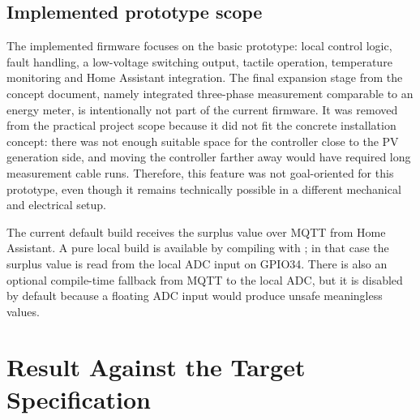 \documentclass[12pt,a4paper]{article}
\newcommand{\code}[1]{\texttt{\detokenize{#1}}}
\begin{document}
\subsection{Implemented prototype scope}

The implemented firmware focuses on the basic prototype: local control logic,
fault handling, a low-voltage switching output, tactile operation, temperature
monitoring and Home Assistant integration. The final expansion stage from the
concept document, namely integrated three-phase measurement comparable to an
energy meter, is intentionally not part of the current firmware. It was removed
from the practical project scope because it did not fit the concrete installation
concept: there was not enough suitable space for the controller close to the PV
generation side, and moving the controller farther away would have required long
measurement cable runs. Therefore, this feature was not goal-oriented for this
prototype, even though it remains technically possible in a different mechanical
and electrical setup.

The current default build receives the surplus value over MQTT from Home
Assistant. A pure local build is available by compiling with
\code{-D ENABLE_WIFI=0}; in that case the surplus value is read from the local
ADC input on GPIO34. There is also an optional compile-time fallback from MQTT to
the local ADC, but it is disabled by default because a floating ADC input would
produce unsafe meaningless values.

\newpage
\section{Result Against the Target Specification}
\end{document}
